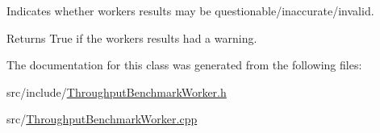 Indicates whether worker\textquotesingle{}s results may be questionable/inaccurate/invalid. 

\begin{DoxyReturn}{Returns}
True if the worker\textquotesingle{}s results had a warning. 
\end{DoxyReturn}


The documentation for this class was generated from the following files\+:\begin{DoxyCompactItemize}
\item 
src/include/\hyperlink{_throughput_benchmark_worker_8h}{Throughput\+Benchmark\+Worker.\+h}\item 
src/\hyperlink{_throughput_benchmark_worker_8cpp}{Throughput\+Benchmark\+Worker.\+cpp}\end{DoxyCompactItemize}
